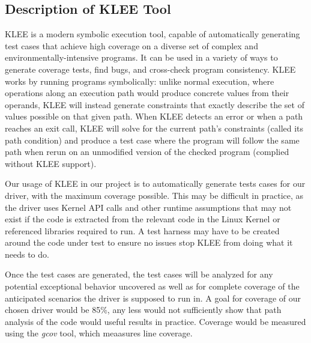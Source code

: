 \subsection{Description of KLEE Tool}
KLEE is a modern symbolic execution tool, capable of automatically generating test cases that 
achieve high coverage on a diverse set of complex and environmentally-intensive programs.
It can be used in a variety of ways to generate coverage tests, find bugs, and cross-check program
consistency.\cite{kleepaper}
KLEE works by running programs symbolically: unlike normal execution,
where operations along an execution path would produce concrete values from their operands,
KLEE will instead generate constraints that exactly describe the set of values possible
on that given path.
When KLEE detects an error or when a path reaches an exit call, 
KLEE will solve for the current path’s constraints (called its path condition)
and produce a test case where the program will follow the same path when rerun 
on an unmodified version of the checked program (complied without KLEE support).
\par
Our usage of KLEE in our project is to automatically generate tests cases for our
driver, with the maximum coverage possible.
This may be difficult in practice, as the driver uses Kernel API calls and other
runtime assumptions that may not exist if the code is extracted from the relevant code in
the Linux Kernel or referenced libraries required to run.
A test harness may have to be created around the code under test to ensure no issues
stop KLEE from doing what it needs to do.
\par
Once the test cases are generated, the test cases will be analyzed for any
potential exceptional behavior uncovered as well as for complete coverage of the 
anticipated scenarios the driver is supposed to run in.
A goal for coverage of our chosen driver would be 85\%, any less would not sufficiently
show that path analysis of the code would useful results in practice.
Coverage would be measured using the \textit{gcov} tool, which meaasures line coverage.

